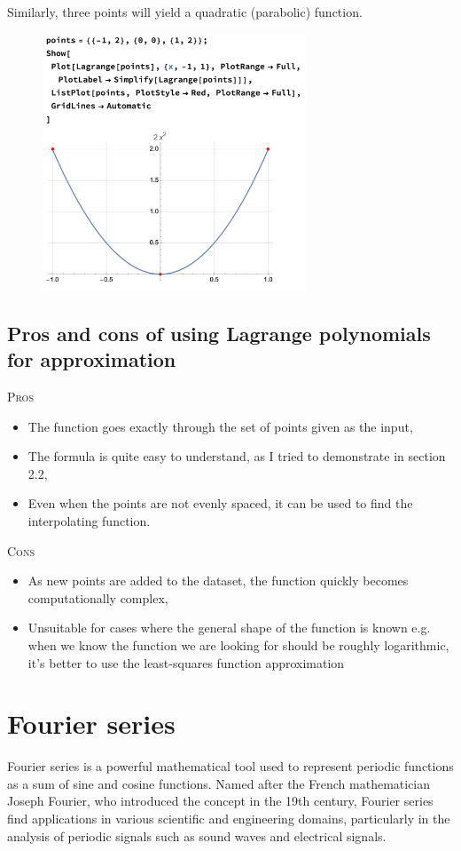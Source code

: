 \documentclass{MathematicaReport}
\begin{document}
Similarly, three points will yield a quadratic (parabolic) function.
\begin{figure}[H]
\centering
\includegraphics[width=0.7\textwidth]{images/lagrange_example4.png}
\end{figure}


\subsection{Pros and cons of using Lagrange polynomials for approximation}

\textsc{Pros}
\begin{itemize}
	\item The function goes exactly through the set of points given as the input,
	\item The formula is quite easy to understand, as I tried to demonstrate in
		section 2.2,
	\item Even when the points are not evenly spaced, it can be used to find the 
		interpolating function.
\end{itemize}

\textsc{Cons}
\begin{itemize}
	\item As new points are added to the dataset, the function quickly becomes
		computationally complex,
	\item Unsuitable for cases where the general shape of the function is known
		e.g. when we know the function we are looking for should be roughly
		logarithmic, it's better to use the least-squares function approximation
\end{itemize}

\section{Fourier series}
Fourier series is a powerful mathematical tool used to represent periodic functions as a sum of sine and cosine functions. Named after the French mathematician Joseph Fourier, who introduced the concept in the 19th century, Fourier series find applications in various scientific and engineering domains, particularly in the analysis of periodic signals such as sound waves and electrical signals. \\
\end{document}
